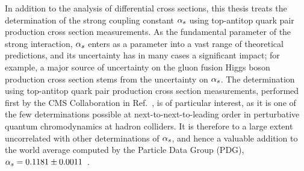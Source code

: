 In addition to the analysis of differential cross sections, this thesis treats the determination of the strong coupling constant $\alpha_s$ using top-antitop quark pair production cross section measurements.
% 
As the fundamental parameter of the strong interaction, $\alpha_s$ enters as a parameter into a vast range of theoretical predictions, and its uncertainty has in many cases a significant impact; for example, a major source of uncertainty on the gluon fusion Higgs boson production cross section stems from the uncertainty on $\alpha_s$.
% 
The determination using top-antitop quark pair production cross section measurements, performed first by the CMS Collaboration in Ref.~\cite{Chatrchyan:2013haa}, is of particular interest, as it is one of the few determinations possible at next-to-next-to-leading order in perturbative quantum chromodynamics at hadron colliders.
% 
It is therefore to a large extent uncorrelated with other determinations of $\alpha_s$, and hence a valuable addition to the world average computed by the Particle Data Group (PDG), $\alpha_s = 0.1181 \pm 0.0011$~\cite{pdg}.




